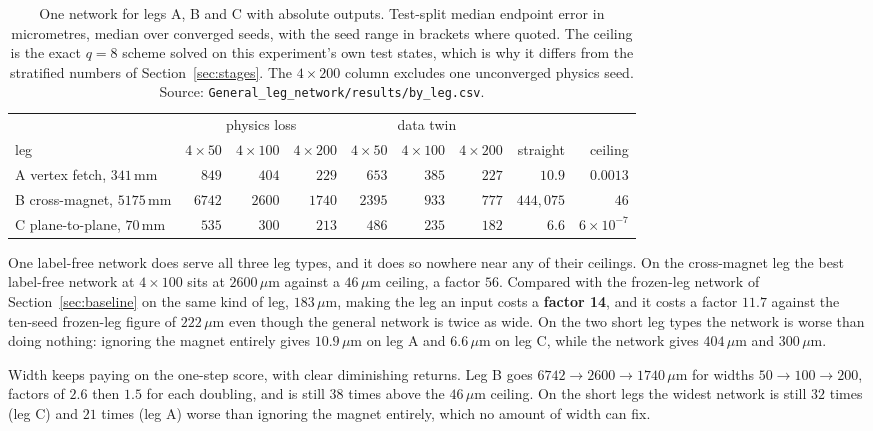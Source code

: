 \documentclass[11pt,a4paper]{article}
\newcommand{\um}{\ensuremath{\,\mu\mathrm{m}}}
\newcommand{\mm}{\ensuremath{\,\mathrm{mm}}}
\begin{document}
\begin{table}[tbp]
  \centering
  \caption{One network for legs A, B and C with absolute outputs. Test-split
  median endpoint error in micrometres, median over converged seeds, with the
  seed range in brackets where quoted. The ceiling is the exact $q = 8$ scheme
  solved on this experiment's own test states, which is why it differs from the
  stratified numbers of Section~\ref{sec:stages}. The $4 \times 200$ column
  excludes one unconverged physics seed. Source:
  \texttt{General\_leg\_network/results/by\_leg.csv}.}
  \label{tab:general}
  \footnotesize
  \setlength{\tabcolsep}{3pt}
  \begin{tabular}{lrrrrrrrr}
    \toprule
    & \multicolumn{3}{c}{physics loss} & \multicolumn{3}{c}{data twin}
    & & \\
    \cmidrule(lr){2-4}\cmidrule(lr){5-7}
    leg & $4\times50$ & $4\times100$ & $4\times200$
        & $4\times50$ & $4\times100$ & $4\times200$
        & straight & ceiling \\
    \midrule
    A vertex fetch, $341\mm$   & $849$  & $404$  & $229$  & $653$  & $385$ & $227$ & $10.9$     & $0.0013$ \\
    B cross-magnet, $5175\mm$  & $6742$ & $2600$ & $1740$ & $2395$ & $933$ & $777$ & $444{,}075$ & $46$ \\
    C plane-to-plane, $70\mm$  & $535$  & $300$  & $213$  & $486$  & $235$ & $182$ & $6.6$      & $6\times10^{-7}$ \\
    \bottomrule
  \end{tabular}
\end{table}

One label-free network does serve all three leg types, and it does so nowhere
near any of their ceilings. On the cross-magnet leg the best label-free network
at $4 \times 100$ sits at $2600\um$ against a $46\um$ ceiling, a factor $56$.
Compared with the frozen-leg network of Section~\ref{sec:baseline} on the same
kind of leg, $183\um$, making the leg an input costs a \textbf{factor 14}, and
it costs a factor $11.7$ against the ten-seed frozen-leg figure of $222\um$ even
though the general network is twice as wide. On the two short leg types the
network is worse than doing nothing: ignoring the magnet entirely gives
$10.9\um$ on leg A and $6.6\um$ on leg C, while the network gives $404\um$ and
$300\um$.

Width keeps paying on the one-step score, with clear diminishing returns. Leg B
goes $6742 \to 2600 \to 1740\um$ for widths $50 \to 100 \to 200$, factors of
$2.6$ then $1.5$ for each doubling, and is still $38$ times above the $46\um$
ceiling. On the short legs the widest network is still $32$ times (leg C) and
$21$ times (leg A) worse than ignoring the magnet entirely, which no amount of
width can fix.
\end{document}
